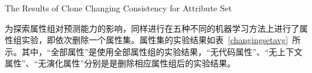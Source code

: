 
{The Results of Clone Changing Consistency for Attribute Set}

为探索属性组对预测能力的影响，同样进行在五种不同的机器学习方法上进行了属性组实验，即依次删除一个属性集。属性集的实验结果如表~\ref{changingsetavg}~所示。其中，“全部属性”是使用全部属性组的实验结果，“无代码属性”、“无上下文属性”、“无演化属性”分别是是删除相应属性组后的实验结果。

